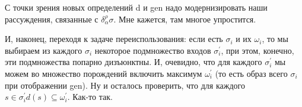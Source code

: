     С точки зрения новых определений d и gen надо модернизировать наши рассуждения, связанные
с $\delta^\rho_\alpha\sigma$. Мне кажется, там многое упростится.

    И, наконец, переходя к задаче переиспользования: если есть $\sigma_i$ и их $\omega_i$, то мы выбираем
из каждого $\sigma_i$ некоторое подмножество входов $\sigma_i^\prime$, при этом, конечно, эти подмножества
попарно дизъюнктны. И, очевидно, что для каждого $\sigma_i^\prime$ мы можем во множество порождений
включить максимум $\omega_i^\prime$ (то есть образ всего $\sigma_i$ при отображении gen). Ну и осталось проверить,
что для каждого $s\in\sigma_i^\prime d(s)\subseteq\omega_i^\prime$. Как-то так.


